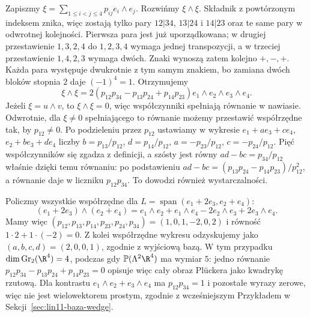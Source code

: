 \begin{przyklad}
Zapiszmy $\xi=\sum_{1\leq i<j\leq4}p_{ij}e_i\wedge e_j$.
Rozwińmy $\xi\wedge\xi$. Składnik z powtórzonym
indeksem znika, więc zostają tylko pary $12|34$, $13|24$
i $14|23$ oraz te same pary w odwrotnej kolejności.
Pierwsza para jest już uporządkowana; w drugiej
przestawienie $1,3,2,4$ do $1,2,3,4$ wymaga jednej
transpozycji, a w trzeciej przestawienie $1,4,2,3$
wymaga dwóch. Znaki wynoszą zatem kolejno $+,-,+$.
Każda para występuje dwukrotnie z tym samym znakiem,
bo zamiana dwóch bloków stopnia $2$ daje $(-1)^4=1$.
Otrzymujemy
\begin{equation}\label{eq:lin29-plucker-24}
 \xi\wedge\xi=
 2(p_{12}p_{34}-p_{13}p_{24}+p_{14}p_{23})
   e_1\wedge e_2\wedge e_3\wedge e_4.
\end{equation}
Jeżeli $\xi=u\wedge v$, to $\xi\wedge\xi=0$,
więc współczynniki spełniają równanie w nawiasie.
Odwrotnie, dla $\xi\ne0$ spełniającego to równanie możemy
przestawić współrzędne tak, by $p_{12}\ne0$.
Po podzieleniu przez $p_{12}$ ustawiamy w wykresie
$e_1+ae_3+ce_4$, $e_2+be_3+de_4$ liczby
$b=p_{13}/p_{12}$, $d=p_{14}/p_{12}$,
$a=-p_{23}/p_{12}$, $c=-p_{24}/p_{12}$.
Pięć współczynników się zgadza z definicji,
a szósty jest równy $ad-bc=p_{34}/p_{12}$
właśnie dzięki temu równaniu: po podstawieniu
$ad-bc=(p_{13}p_{24}-p_{14}p_{23})/p_{12}^2$,
a równanie daje w liczniku $p_{12}p_{34}$.
To dowodzi również
wystarczalności.

Policzmy wszystkie współrzędne dla
$L=\operatorname{span}(e_1+2e_3,e_2+e_4)$:
\[
 (e_1+2e_3)\wedge(e_2+e_4)
  =e_1\wedge e_2+e_1\wedge e_4
   -2e_2\wedge e_3+2e_3\wedge e_4.
\]
Mamy więc $(p_{12},p_{13},p_{14},p_{23},p_{24},p_{34})
=(1,0,1,-2,0,2)$ i równość $1\cdot2+1\cdot(-2)=0$.
Z kolei współrzędne wykresu odzyskujemy jako
$(a,b,c,d)=(2,0,0,1)$, zgodnie z wyjściową bazą.
W tym przypadku $\dim\operatorname{Gr}_2(\R^4)=4$,
podczas gdy $\mathbb P(\Lambda^2\R^4)$ ma wymiar $5$:
jedno równanie $p_{12}p_{34}-p_{13}p_{24}+p_{14}p_{23}=0$
opisuje więc cały obraz Plückera jako kwadrykę rzutową.
Dla kontrastu
$e_1\wedge e_2+e_3\wedge e_4$ ma
$p_{12}p_{34}=1$ i pozostałe wyrazy zerowe,
więc nie jest wielowektorem prostym, zgodnie
z wcześniejszym Przykładem w
Sekcji~\ref{sec:lin11-baza-wedge}.
\end{przyklad}

